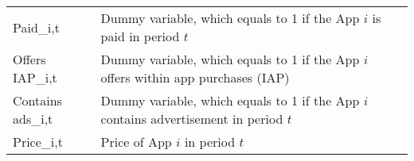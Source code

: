 \begin{table}[h!]
\begin{tabular}{ll}
Paid_{i,t}                                                    &  \makecell[l]{Dummy variable, which equals to 1 if \\ the App $i$ is paid in period $t$} \\
Offers IAP_{i,t}                                              &  \makecell[l]{Dummy variable, which equals to 1 if \\ the App $i$ offers within app purchases (IAP)} \\
Contains ads_{i,t}                                            &  \makecell[l]{Dummy variable, which equals to 1 if \\ the App $i$ contains advertisement in period $t$} \\
Price_{i,t}                                                   &  Price of App $i$ in period $t$ \\
\bottomrule
\end{tabular}
\end{table}
